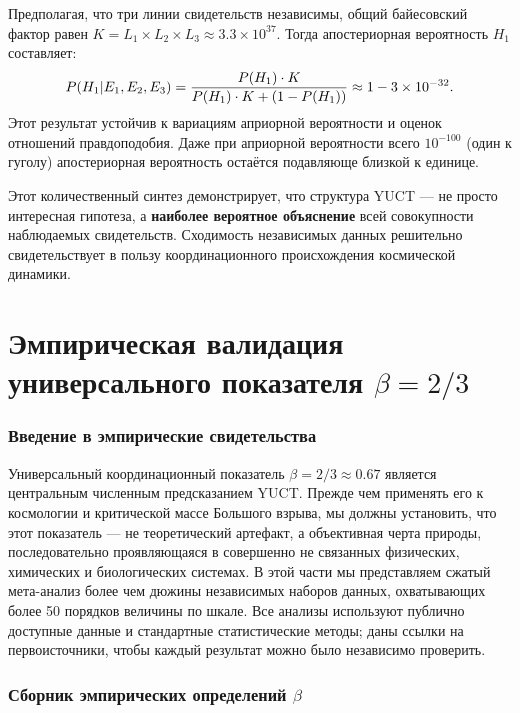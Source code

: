 \documentclass[11pt,a4paper]{article}
\begin{document}
	Предполагая, что три линии свидетельств независимы, общий байесовский фактор равен \(K = L_1 \times L_2 \times L_3 \approx 3.3 \times 10^{37}\). Тогда апостериорная вероятность \(H_1\) составляет:
	\begin{equation}
		\scriptsize
		P(H_1 | E_1, E_2, E_3) = \frac{P(H_1) \cdot K}{P(H_1) \cdot K + (1 - P(H_1))} \approx 1 - 3 \times 10^{-32}.
	\end{equation}
	Этот результат устойчив к вариациям априорной вероятности и оценок отношений правдоподобия. Даже при априорной вероятности всего \(10^{-100}\) (один к гуголу) апостериорная вероятность остаётся подавляюще близкой к единице.
	
	Этот количественный синтез демонстрирует, что структура YUCT — не просто интересная гипотеза, а \textbf{наиболее вероятное объяснение} всей совокупности наблюдаемых свидетельств. Сходимость независимых данных решительно свидетельствует в пользу координационного происхождения космической динамики.
	
	
	\clearpage
	\part{Эмпирическая валидация универсального показателя \(\beta = 2/3\)}
	\label{part:V}
	
	\section{Введение в эмпирические свидетельства}
	
	Универсальный координационный показатель \(\beta = 2/3 \approx 0.67\) является центральным численным предсказанием YUCT. Прежде чем применять его к космологии и критической массе Большого взрыва, мы должны установить, что этот показатель — не теоретический артефакт, а объективная черта природы, последовательно проявляющаяся в совершенно не связанных физических, химических и биологических системах. В этой части мы представляем сжатый мета-анализ более чем дюжины независимых наборов данных, охватывающих более 50 порядков величины по шкале. Все анализы используют публично доступные данные и стандартные статистические методы; даны ссылки на первоисточники, чтобы каждый результат можно было независимо проверить.
	
	\section{Сборник эмпирических определений \(\beta\)}
	
\end{document}
